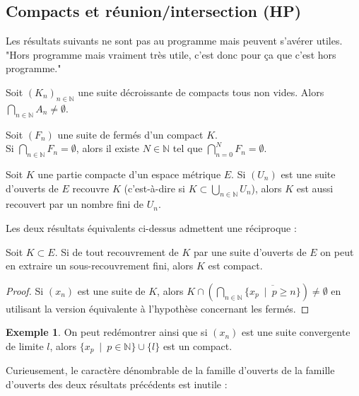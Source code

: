 \documentclass[french]{article}
\newcommand{\N}{\mathbb{N}}
\theoremstyle{plain}
\theoremstyle{definition}
\newtheorem*{ex}{Exemple}
\theoremstyle{remark}
\begin{document}
\subsection{Compacts et réunion/intersection (HP)}

Les résultats suivants ne sont pas au programme mais peuvent s'avérer utiles. \\
"Hors programme mais vraiment très utile, c'est donc pour ça que c'est hors programme."

\begin{thm}
	Soit $(K_n)_{n\in\N}$ une suite décroissante de compacts tous non vides. Alors $\displaystyle\bigcap_{n\in\N}A_n\ne\emptyset$.
\end{thm}

\begin{cor}%
	Soit $(F_n)$ une suite de fermés d'un compact $K$. \\
	Si $\displaystyle\bigcap_{n\in\N} F_n=\emptyset$, alors il existe $N\in\N$ tel que $\displaystyle\bigcap_{n=0}^NF_n=\emptyset$.
\end{cor}

\begin{cor}%
	Soit $K$ une partie compacte d'un espace métrique $E$. Si $(U_n)$ est une suite d'ouverts de $E$ recouvre $K$ (c'est-à-dire si $K\subset\displaystyle\bigcup_{n\in\N}U_n$), alors $K$ est aussi recouvert par un nombre fini de $U_n$.
\end{cor}

Les deux résultats équivalents ci-dessus admettent une réciproque :

\begin{prop}%
	Soit $K\subset E$. Si de tout recouvrement de $K$ par une suite d'ouverts de $E$ on peut en extraire un sous-recouvrement fini, alors $K$ est compact.
\end{prop}
\begin{proof}
	Si $(x_n)$ est une suite de $K$, alors $K\cap\displaystyle\left(\bigcap_{n\in\N}\overline{\{x_p\ \mid\ p\geqslant n\}}\right)\ne\emptyset$ en utilisant la version équivalente à l'hypothèse concernant les fermés.
\end{proof}

\begin{ex}
	On peut redémontrer ainsi que si $(x_n)$ est une suite convergente de limite $l$, alors $\{x_p\ \mid\ p\in\N\}\cup\{l\}$ est un compact.
\end{ex}

Curieusement, le caractère dénombrable de la famille d'ouverts de la famille d'ouverts des deux résultats précédents est inutile :
\end{document}
